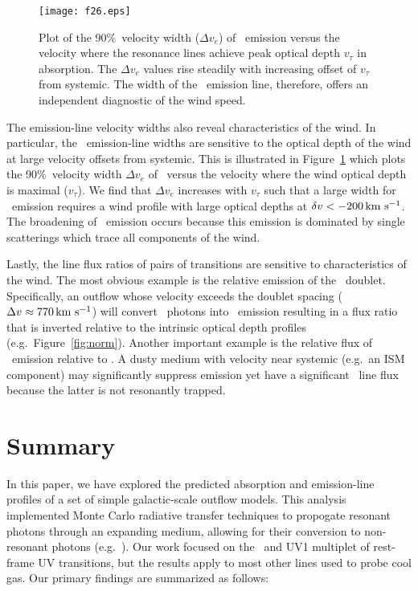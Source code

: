 \documentclass[]{emulateapj}
\begin{document}
\begin{figure}
\texttt{[image: f26.eps]}
\caption{
Plot of the 90\%\ velocity width ($\Delta v_e$) of \feiic\ emission versus the
velocity where the resonance lines achieve peak optical depth
$v_\tau$ in absorption.  The $\Delta v_e$ values rise steadily with
increasing offset of $v_\tau$ from systemic.  The width of the \feiic\
emission line, therefore, offers an independent diagnostic of the wind
speed.
}
\label{fig:obs_edelv}
\end{figure}


The emission-line velocity widths also reveal
characteristics of the wind.  In particular, the \feiis\ emission-line 
widths are
sensitive to the optical depth of the wind at large velocity offsets from
systemic.  This is illustrated in Figure~\ref{fig:obs_edelv} which plots
the 90\%\ velocity width $\Delta v_e$ of \feiic\ versus the velocity
where the wind optical depth is maximal ($v_\tau$).  We find that
$\Delta v_e$ increases with $v_\tau$ such that a large width for
\feiis\ emission requires a wind profile with large optical depths at
$\delta v < -200 \, {\rm km~s^{-1}}$.  The broadening of \feiis\ emission occurs
because this emission is dominated by single scatterings 
which trace all components of the wind.  

Lastly, the line flux ratios of pairs of transitions 
are sensitive to characteristics of the wind.
The most obvious example is the relative emission of the \mgiid\
doublet.  Specifically, an outflow whose velocity exceeds the doublet
spacing ($\Delta v \approx 770 \, {\rm km~s^{-1}}$) will convert \mgiia\ photons
into \mgiib\ emission resulting in a flux ratio that is inverted
relative to the intrinsic optical depth profiles (e.g.\
Figure~\ref{fig:norm}).  Another important example is the relative
flux of \feiis\ emission relative to .  
A dusty medium with velocity near systemic (e.g.\ an
ISM component) may significantly suppress \ion{Mg}{2} emission yet
have a significant \feiis\ line flux because the latter is not
resonantly trapped.  

\section{Summary}
\label{sec:summary}

In this paper, we have explored the predicted absorption and
emission-line profiles of a set of simple galactic-scale outflow
models.  This analysis implemented Monte Carlo radiative transfer
techniques to propogate resonant photons through an expanding medium,
allowing for their conversion to non-resonant photons (e.g.\ \feiis).
Our work focused on the \mgiid\ and \ion{Fe}{2} UV1
multiplet of rest-frame UV transitions, but the results apply to
most other lines used to probe cool gas.  Our primary
findings are summarized as follows:
\end{document}
